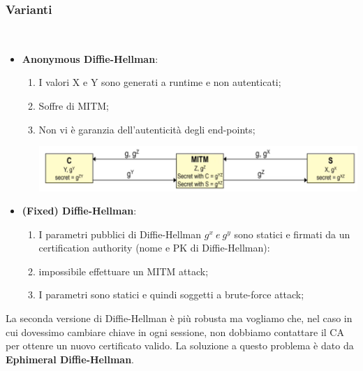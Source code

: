 \documentclass{book}
\theoremstyle{remark}
\begin{document}
\subsubsection{Varianti}\mbox{}\\
\begin{itemize}
	\item \textbf{Anonymous Diffie-Hellman}:\begin{enumerate}
		      \item I valori X e Y sono generati a runtime e non autenticati;\@
		      \item Soffre di MITM;\@
		      \item  Non vi è garanzia dell'autenticità degli end-points;\@
		            \begin{center}
			            \includegraphics[scale=0.6]{2021-12-07-16-22-29.png}
		            \end{center}
	      \end{enumerate}
	\item \textbf{ (Fixed) Diffie-Hellman}:\begin{enumerate}
		      \item I parametri pubblici di Diffie-Hellman \(g^x\ e\ g^y\) sono statici e firmati da un certification authority (nome e PK di Diffie-Hellman):
		      \item impossibile effettuare un MITM attack;\@
		      \item I parametri sono statici e quindi soggetti a brute-force attack;\@
	      \end{enumerate}
\end{itemize}
La seconda versione di Diffie-Hellman è più robusta ma vogliamo che, nel caso in cui dovessimo cambiare chiave in ogni sessione, non dobbiamo contattare il CA per ottenre un nuovo certificato valido\@. La soluzione a questo problema è dato da \textbf{Ephimeral Diffie-Hellman}\@.
\end{document}
